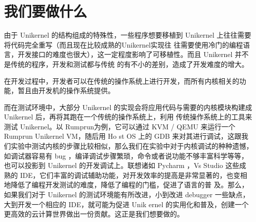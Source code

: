 \chapter{我们要做什么}

由于 Unikernel 的结构组成的特殊性，一些程序想要移植到 Unikernel 上往往需要将代码完全重写（而且现在比较成熟的Unikernel实现往
往需要使用冷门的编程语言，开发接口的难度也很大），这一定程度影响了可移植性。而且 Unikernel 并不是传统的程序，开发和测试都与传统
的有不小的差别，造成了开发难度的增大。

在开发过程中，开发者可以在传统的操作系统上进行开发，而所有内核相关的功能，暂且由开发机的操作系统提供。

而在测试环境中，大部分 Unikernel 的实现会将应用代码与需要的内核模块构建成 Unikernel 后，再将其跑在一个传统的操作系统上，利用
传统操作系统上的工具来测试 Unikernel。以 Rumprun为例，它可以通过 KVM / QEMU 来运行一个 Rumprun Unikernel VM，随后用 Ho
st OS 上的 GDB 来对其进行调试，这跟我们实验中测试内核的步骤比较相似，那么我们在实验中对于内核调试的种种遗憾，如调试器容易有 bug
，编译调试步骤繁琐，命令或者说功能不够丰富科学等等，也可以投影到 Unikernel 的开发调试上。联想诸如 Pycharm ，Vs Studio 这些成
熟的 IDE，它们丰富的调试辅助功能，对开发效率的提高是非常显著的，也变相地降低了编程开发测试的难度，降低了编程的门槛，促进了语言的普
及。那么，如果我们对于 Unikernel 的测试环境能有所改进，小到改进 debugger 一些缺点，大到开发一个相应的 IDE，就可能为促进 Unik
ernel 的实用化和普及，创建一个更高效的云计算世界做出一份贡献。这正是我们想要做的。